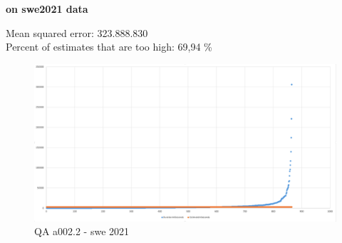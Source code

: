 \textbf{on swe2021 data}

Mean squared error: 323.888.830\\
Percent of estimates that are too high: 69,94 \%

\begin{figure}
\centering
\includegraphics[width=\textwidth]{Documentation/10000-A002/a002_2-swe2021.png}
\caption{QA a002.2 - swe 2021}
\end{figure}
